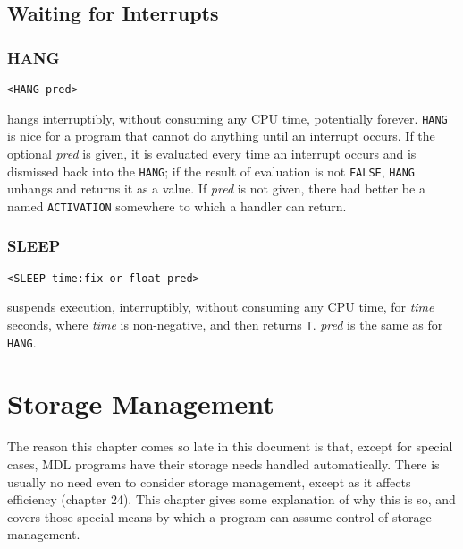 \documentclass[a4paper]{scrbook}
\begin{document}
\section{Waiting for Interrupts}\label{waiting-for-interrupts}

\subsection{HANG}\label{hang}

\begin{verbatim}
<HANG pred>
\end{verbatim}

 hangs interruptibly, without consuming any CPU time, potentially forever. \texttt{HANG} is
nice for a program that cannot do anything until an interrupt occurs. If the optional \emph{pred} is given, it is evaluated
every time an interrupt occurs and is dismissed back into the \texttt{HANG}; if the result of evaluation is not
\texttt{FALSE}, \texttt{HANG} unhangs and returns it as a value. If \emph{pred} is not given, there had better be a named
\texttt{ACTIVATION} somewhere to which a handler can return.

\subsection{SLEEP}\label{sleep}

\begin{verbatim}
<SLEEP time:fix-or-float pred>
\end{verbatim}

 suspends execution, interruptibly, without consuming any CPU time, for \emph{time} seconds,
where \emph{time} is non-negative, and then returns \texttt{T}. \emph{pred} is the same as for \texttt{HANG}.

\chapter{Storage Management}\label{chapter-22.-storage-management}

The reason this chapter comes so late in this document is that, except for special cases, MDL programs have their storage
needs handled automatically. There is usually no need even to consider storage management, except as it affects efficiency
(chapter 24). This chapter gives some explanation of why this is so, and covers those special means by which a program can
assume control of storage management.
\end{document}
